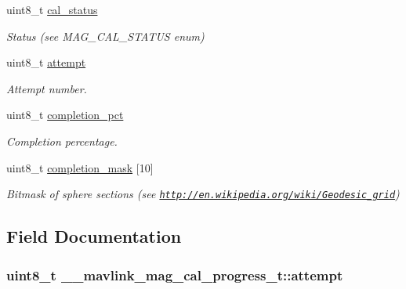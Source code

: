 \begin{DoxyCompactItemize}
uint8\+\_\+t \hyperlink{struct____mavlink__mag__cal__progress__t_a8c87e5a7d1e4ba20ae63e72f463f08d8}{cal\+\_\+status}
\begin{DoxyCompactList}\small\item\em Status (see M\+A\+G\+\_\+\+C\+A\+L\+\_\+\+S\+T\+A\+T\+U\+S enum) \end{DoxyCompactList}\item 
uint8\+\_\+t \hyperlink{struct____mavlink__mag__cal__progress__t_a1f5e7c770402e1a04c28e5f1ca1fd2b8}{attempt}
\begin{DoxyCompactList}\small\item\em Attempt number. \end{DoxyCompactList}\item 
uint8\+\_\+t \hyperlink{struct____mavlink__mag__cal__progress__t_a9b0f5a88d925b9e667e4714770c119ed}{completion\+\_\+pct}
\begin{DoxyCompactList}\small\item\em Completion percentage. \end{DoxyCompactList}\item 
uint8\+\_\+t \hyperlink{struct____mavlink__mag__cal__progress__t_a943429de851771dff29cb6b0f2ced1df}{completion\+\_\+mask} \mbox{[}10\mbox{]}
\begin{DoxyCompactList}\small\item\em Bitmask of sphere sections (see \href{http://en.wikipedia.org/wiki/Geodesic_grid}{\tt http\+://en.\+wikipedia.\+org/wiki/\+Geodesic\+\_\+grid}) \end{DoxyCompactList}\end{DoxyCompactItemize}


\subsection{Field Documentation}
\hypertarget{struct____mavlink__mag__cal__progress__t_a1f5e7c770402e1a04c28e5f1ca1fd2b8}{
\subsubsection[{attempt}]{\setlength{\rightskip}{0pt plus 5cm}uint8\+\_\+t \+\_\+\+\_\+mavlink\+\_\+mag\+\_\+cal\+\_\+progress\+\_\+t\+::attempt}}\label{struct____mavlink__mag__cal__progress__t_a1f5e7c770402e1a04c28e5f1ca1fd2b8}


